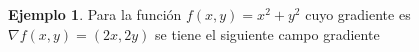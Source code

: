 \documentclass[11pt,letterpaper]{article}
\theoremstyle{definition}
\theoremstyle{definition}
\newtheorem{ej}{Ejemplo}[section]
\theoremstyle{definition}
\theoremstyle{definition}
\theoremstyle{definition}
\theoremstyle{definition}
\theoremstyle{definition}
\theoremstyle{definition}
\begin{document}
\begin{ej}
	Para la función $ f(x,y)=x^2+y^2  $ cuyo gradiente es $ \nabla f(x,y)=(2x,2y) $ se tiene el siguiente campo gradiente
	\begin{center}
		

\end{center}
\end{ej}
\end{document}
